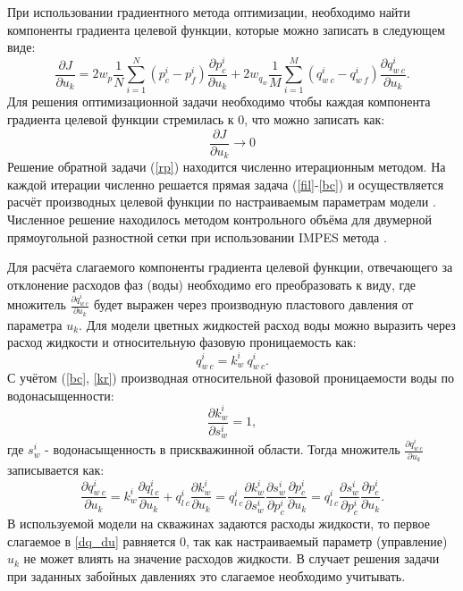 \documentclass{article}
\begin{document}
При использовании градиентного метода оптимизации, необходимо найти компоненты градиента целевой функции, которые можно записать в следующем виде:
\begin{equation}
\frac{\partial J}{\partial u_k} = 2w_p\frac{1}{N}\sum_{i=1}^N ({p_c^i-p_f^i})\frac{\partial p_c^i}{\partial u_k}+2w_{q_w}\frac{1}{M}\sum_{i=1}^M{\left(q_{w\:c}^i-q_{w\:f}^i\right)}\frac{\partial q_{w\:c}^i}{\partial u_k}.
\end{equation}
Для решения оптимизационной задачи необходимо чтобы каждая компонента градиента целевой функции стремилась к 0, что можно записать как:
\begin{equation} \label{rp}
	 \frac{\partial J}{\partial u_k} \rightarrow 0
\end{equation}
Решение обратной задачи (\ref{rp}) находится численно итерационным методом. На каждой итерации численно решается прямая задача (\ref{fil}-\ref{bc}) и осуществляется расчёт производных целевой функции по настраиваемым параметрам модели \cite{opt}. Численное решение находилось методом контрольного объёма  для двумерной прямоугольной разностной сетки при использовании IMPES метода \cite{azi}.

Для расчёта слагаемого компоненты градиента целевой функции, отвечающего за отклонение расходов фаз (воды) необходимо его преобразовать к виду, где множитель $\frac{\partial q_{w\:c}^i}{\partial u_k}$ будет выражен через производную пластового давления от параметра $u_k$. Для модели цветных жидкостей расход воды можно выразить через расход жидкости и относительную фазовую проницаемость как:
 \begin{equation*}
 	q_{w\:c}^i = k_{w}^i \: q_{w\:c}^i.
 \end{equation*}
С учётом (\ref{bc}, \ref{kr}) производная относительной фазовой проницаемости воды по водонасыщенности:
 \begin{equation*}
	\frac{\partial k_{w}^i}{\partial s_w^i} = 1,
\end{equation*}
где $s_w^i$ - водонасыщенность в прискважинной области.
Тогда множитель $\frac{\partial q_{w\:c}^i}{\partial u_k}$ записывается как:
\begin{equation} \label{dq_du}
\frac{\partial q_{w\:c}^i}{\partial u_k} = k_{w}^i \frac{\partial q_{l\:c}^i}{\partial u_k} + q_{l\:c}^i \frac{\partial k_{w}^i}{\partial u_k} = q_{l\:c}^i \frac{\partial k_{w}^i}{\partial s_w^i} \frac{\partial s_w^i}{\partial p_c^i}\frac{\partial p_c^i}{\partial u_k} =  q_{l\:c}^i  \frac{\partial s_w^i}{\partial p_c^i}\frac{\partial p_c^i}{\partial u_k}.
\end{equation}
В используемой модели на скважинах задаются расходы жидкости, то первое слагаемое в \ref{dq_du} равняется 0, так как настраиваемый параметр (управление) $u_k$ не может влиять на значение расходов жидкости. В случает решения задачи при заданных забойных давлениях это слагаемое необходимо учитывать.
\end{document}
